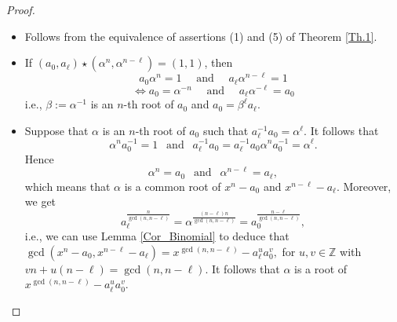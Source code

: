 \documentclass[12pt]{elsarticle}
\newcommand{\Fq}{\mathbb{F}_{q}}
\theoremstyle{break}
{\theorembodyfont{\upshape}
    \newtheorem{theorem}{Theorem}[section] %
    \newtheorem{lemma}[theorem]{Lemma} %
    \newtheorem{proposition}[theorem]{Proposition}
    \newtheorem{corollary}[theorem]{Corollary}
    \newtheorem{definition}[theorem]{Definition}
    \newtheorem{example}[theorem]{Example}
    \newtheorem{remark}[theorem]{Remark}
    \newtheorem{conjecture}[theorem]{Conjecture}
    \newtheorem*{proof}{{Proof}}
	\newtheorem*{notation}{Notation}
	\newtheorem*{main}{Cain Theorem}
	\newtheorem*{problem}{Problem}
}
\begin{document}
\begin{proof}
\begin{itemize}
    \item[(1) $\Rightarrow$ (2)] Follows from the equivalence of assertions (1) and (5) of Theorem \ref{Th.1}.
 \item[(2) $\Rightarrow$ (3)]  
 If $(a_0, a_{\ell})\star(\alpha^n, \alpha^{n-\ell}) = (1, 1)$, then 
 $$a_0 \alpha^n=1 \quad \text{ and } \quad a_\ell \alpha^{n-\ell}=1$$
 $$\iff a_0 =\alpha^{-n} \quad \text{ and } \quad a_\ell \alpha^{-\ell}=a_0$$
  i.e., $\beta:=\alpha^{-1}$ is an $n$-th root of $a_0$ and $a_0=\beta^\ell a_\ell$.
 

 \item[(3) $\Rightarrow$ (4)] Suppose that $\alpha $ is an $n$-th root of $a_0$ such that $ a_{\ell}^{-1}  a_0 = \alpha^\ell$.
 It follows that 
 $$ \alpha^{n} a_0^{-1} = 1 \ \ \text{ and } \ \  a_{\ell}^{-1}  a_0= a_{\ell}^{-1}  a_0  \alpha^{n} a_0^{-1} = \alpha^{\ell}.$$ 
 Hence
 $$ \alpha^{n}  = a_0\ \ \text{ and } \ \    \alpha^{n-\ell}  = a_{\ell},$$
 which means that  $\alpha $ is a common root of $ x^n-a_0$ and $ x^{n-\ell}-a_{\ell}$. 
Moreover, we get
 $$ a_{\ell}^{\frac{n}{\gcd(n,n-\ell)}}= \alpha^{\frac{(n-\ell)n}{\gcd(n,n-\ell)}}=a_0^{\frac{n-\ell}{\gcd(n,n-\ell)}},$$
 i.e., we can use Lemma \ref{Cor_Binomial} to deduce that
 $ \gcd( x^n-a_0, x^{n-\ell}-a_{\ell}) = x^{\gcd(n, n-\ell)} - a_{\ell}^u a_0^v ,  $     for $u, v\in \mathbb Z$ with $  vn+u(n-\ell)=\gcd(n,n-\ell).$   It follows that $\alpha$ is a root of $x^{\gcd(n, n-\ell)} - a_{\ell}^u a_0^v$.


\end{itemize}
\end{proof}
\end{document}
